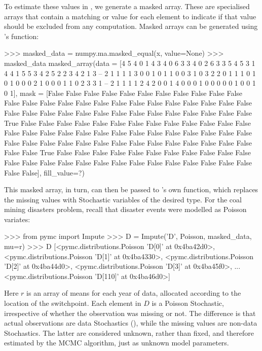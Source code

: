 \documentclass[]{jss}
\begin{document}
To estimate these values in , we generate a masked array. These are specialised  arrays that contain a matching  or  value for each element to indicate if that value should be excluded from any computation. Masked arrays can be generated using 's  function:
\begin{CodeInput}
>>> masked_data = numpy.ma.masked_equal(x, value=None)
>>> masked_data
masked_array(data = [4 5 4 0 1 4 3 4 0 6 3 3 4 0 2 6 3 3 5 4 5 3 1 4 4 1 5 5 3
 4 2 5 2 2 3 4 2 1 3 -- 2 1 1 1 1 3 0 0 1 0 1 1 0 0 3 1 0 3 2 2 0 1 1 1 0 1 0
 1 0 0 0 2 1 0 0 0 1 1 0 2 3 3 1 -- 2 1 1 1 1 2 4 2 0 0 1 4 0 0 0 1 0 0 0 0 0 1
 0 0 1 0 1],
 mask = [False False False False False False False False False False False False
 False False False False False False False False False False False False
 False False False False False False False False False False False False
 False False False  True False False False False False False False False
 False False False False False False False False False False False False
 False False False False False False False False False False False False
 False False False False False False False False False False False  True
 False False False False False False False False False False False False
 False False False False False False False False False False False False
 False False False],
  fill_value=?)

\end{CodeInput}

This masked array, in turn, can then be passed to 's own  function, which replaces the missing values with Stochastic variables of the desired type. For the coal mining disasters problem, recall that disaster events were modelled as Poisson variates:

\begin{CodeInput}
>>> from pymc import Impute
>>> D = Impute('D', Poisson, masked_data, mu=r)
>>> D
[<pymc.distributions.Poisson 'D[0]' at 0x4ba42d0>,
 <pymc.distributions.Poisson 'D[1]' at 0x4ba4330>,
 <pymc.distributions.Poisson 'D[2]' at 0x4ba44d0>,
 <pymc.distributions.Poisson 'D[3]' at 0x4ba45f0>,
...
 <pymc.distributions.Poisson 'D[110]' at 0x4ba46d0>]
\end{CodeInput}

Here $r$ is an array of means for each year of data, allocated according to the location of the switchpoint. Each element in $D$ is a Poisson Stochastic, irrespective of whether the observation was missing or not. The difference is that actual observations are data Stochastics (), while the missing values are non-data Stochastics. The latter are considered unknown, rather than fixed, and therefore estimated by the MCMC algorithm, just as unknown model parameters.
\end{document}
